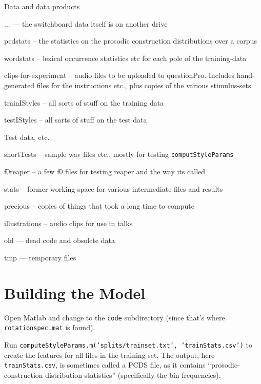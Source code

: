 \documentclass[11pt]{article}
\begin{document}
Data and data products
\begin{description}  \setlength{\itemsep}{0pt}\setlength{\parskip}{0pt}
\item{...} --- the switchboard data itself is on another drive
\item{pcdstats} -- the statistics on the prosodic construction distributions over a corpus
\item{wordstats} -- lexical occurrence statistics etc for each pole of the training-data
\item{clips-for-experiment} -- audio files to be uploaded to
  questionPro.  Includes hand-generated files for the instructions
  etc., plus copies of the various stimulus-sets
\item{trainIStyles} -- all sorts of stuff on the training data 
\item{testIStyles} -- all sorts of  stuff on the test data 
\end{description}

Test data, etc. 

\begin{description}   \setlength{\itemsep}{0pt}\setlength{\parskip}{0pt}
\item{shortTests}  -- sample wav files etc., mostly for testing {\tt computStyleParams}
\item{f0reaper} -- a few f0 files for testing reaper and the way its called
\item{stats} -- former working space for various intermediate files and results
\item{precious} -- copies of things that took a long time to compute
\item{illustrations} -- audio clips for use in talks
\item{old} --- dead code and obsolete data
\item{tmp} --- temporary files 
\end{description}



\section{Building the Model}

Open Matlab and change to the {\tt code} subdirectory (since that's
where {\tt rotationspec.mat} is found).

Run {\tt computeStyleParams.m('splits/trainset.txt',
  'trainStats.csv')} to create the features for all files in the
training set.  The output, here {\tt trainStats.csv}, is sometimes
called a PCDS file, as it contains ``prosodic-construction distribution
statistics'' (specifically the bin frequencies).
\end{document}
